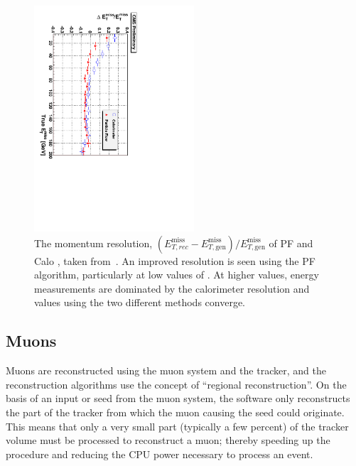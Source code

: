 \begin{figure}[htbp]
  \begin{center}
  \includegraphics[width=0.53\textwidth, angle =90]{Figures/detector/METresPF.pdf}
  \caption{The momentum resolution, $(E^{\mathrm{miss}}_{T,rec} - E^{\mathrm{miss}}_{T,\mathrm{gen}})/E^{\mathrm{miss}}_{T,\mathrm{gen}}$ of \ac{PF} and Calo \MET, taken from~\cite{PFT-09-001}. An improved resolution is seen using the \ac{PF} algorithm, particularly at low values of \MET. At higher \MET values, energy measurements are dominated by the calorimeter resolution and values using the two different methods converge.}
  \label{fig:PFMET}
  \end{center}
\end{figure}

\subsection{Muons}

Muons are reconstructed using the muon system and the tracker, and the reconstruction algorithms use the concept of ``regional reconstruction''. 
On the basis of an input or seed from the muon system, the software only reconstructs the part of the tracker from which the muon causing the seed could originate.
This means that only a very small part (typically a few percent) of the tracker volume must be processed to reconstruct a muon; thereby speeding up the procedure and reducing the CPU power necessary to process an event.

